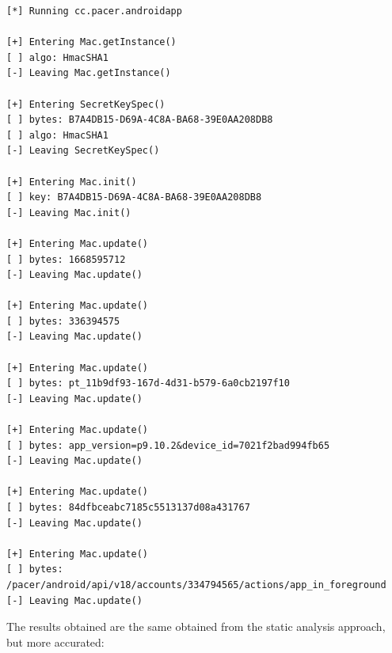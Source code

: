 \begin{lstlisting}
[*] Running cc.pacer.androidapp

[+] Entering Mac.getInstance()
[ ] algo: HmacSHA1
[-] Leaving Mac.getInstance()

[+] Entering SecretKeySpec()
[ ] bytes: B7A4DB15-D69A-4C8A-BA68-39E0AA208DB8
[ ] algo: HmacSHA1
[-] Leaving SecretKeySpec()

[+] Entering Mac.init()
[ ] key: B7A4DB15-D69A-4C8A-BA68-39E0AA208DB8
[-] Leaving Mac.init()

[+] Entering Mac.update()
[ ] bytes: 1668595712
[-] Leaving Mac.update()

[+] Entering Mac.update()
[ ] bytes: 336394575
[-] Leaving Mac.update()

[+] Entering Mac.update()
[ ] bytes: pt_11b9df93-167d-4d31-b579-6a0cb2197f10
[-] Leaving Mac.update()

[+] Entering Mac.update()
[ ] bytes: app_version=p9.10.2&device_id=7021f2bad994fb65
[-] Leaving Mac.update()

[+] Entering Mac.update()
[ ] bytes: 84dfbceabc7185c5513137d08a431767
[-] Leaving Mac.update()

[+] Entering Mac.update()
[ ] bytes: /pacer/android/api/v18/accounts/334794565/actions/app_in_foreground
[-] Leaving Mac.update()
\end{lstlisting}
			The results obtained are the same obtained from the static analysis approach, but more accurated:
